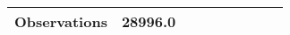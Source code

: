 \begin{table}[htbp]
{\begin{tabular}{l*{1}{cccccccc}}
Observations        &    28996.0         &       &            &    &            &    &              &         \\
\bottomrule
\end{tabular}}
\end{table}
